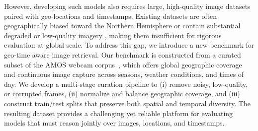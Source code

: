 However, developing such models also requires large, high-quality image datasets paired with geo-locations and timestamps. Existing datasets are often geographically biased toward the Northern Hemisphere \cite{mihail2016sky} or contain substantial degraded or low-quality imagery \cite{jacobs07amos, jacobs09webcamgis}, making them insufficient for rigorous evaluation at global scale. To address this gap, we introduce a new benchmark for geo-time aware image retrieval. Our benchmark is constructed from a curated subset of the AMOS webcam corpus~\cite{jacobs09webcamgis, jacobs07amos}, which offers global geographic coverage and continuous image capture across seasons, weather conditions, and times of day. We develop a multi-stage curation pipeline to (i) remove noisy, low-quality, or corrupted frames, (ii) normalize and balance geographic coverage, and (iii) construct train/test splits that preserve both spatial and temporal diversity. The resulting dataset provides a challenging yet reliable platform for evaluating models that must reason jointly over images, locations, and timestamps.



